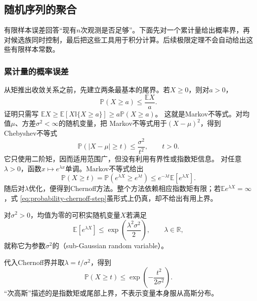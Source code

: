 \subsection{随机序列的聚合}
\label{sec:rv-aggregation}
有限样本误差回答“现有\(n\)次观测是否足够”。下面先对一个累计量给出概率界，再对候选族同时控制，最后把这些工具用于积分计算。后续极限定理不会自动给出这些有限样本常数。

\subsubsection{累计量的概率误差}
\label{sec:probability-basic-tail-bounds}
\label{sec:probability-concentration-inequalities}

从矩推出收敛关系之前，先建立两条最基本的尾界。若\(X\geq0\)，则对\(a>0\)，
\begin{equation}
  \mathbb{P}(X\geq a)
  \leq
  \frac{\mathbb{E}X}{a}.
  \label{eq:probability-markov-inequality}
\end{equation}
证明只需写
\(\mathbb{E}X\geq
\mathbb{E}[X\mathbb{I}\{X\geq a\}]
\geq a\mathbb{P}(X\geq a)\)。
这就是Markov不等式。对均值\(\mu\)、方差\(\sigma^2<\infty\)的随机变量，把
Markov不等式用于\((X-\mu)^2\)，得到Chebyshev不等式
\begin{equation}
  \mathbb{P}(|X-\mu|\geq t)
  \leq\frac{\sigma^2}{t^2},
  \qquad t>0.
  \label{eq:probability-chebyshev-inequality}
\end{equation}
它只使用二阶矩，因而适用范围广，但没有利用有界性或指数矩信息。
对任意\(\lambda>0\)，函数\(x\mapsto e^{\lambda x}\)单调。Markov不等式给出
\begin{equation}
  \mathbb{P}(X\geq t)
  =
  \mathbb{P}(e^{\lambda X}\geq e^{\lambda t})
  \leq
  e^{-\lambda t}\mathbb{E}[e^{\lambda X}].
  \label{eq:probability-chernoff-step}
\end{equation}
随后对\(\lambda\)优化，便得到Chernoff方法。整个方法依赖相应指数矩有限；若\(\mathbb{E}e^{\lambda X}=\infty\)，式
\eqref{eq:probability-chernoff-step}虽形式上仍真，却不给出有用上界。

\begin{definition}[次高斯变量]
  \label{def:probability-subgaussian}
对\(\sigma^2>0\)，均值为零的可积实随机变量\(X\)若满足
\[ \mathbb{E}[e^{\lambda X}]
  \leq\exp\left(\frac{\lambda^2\sigma^2}{2}\right),\qquad \lambda\in\mathbb{R}, \]
就称它为参数\(\sigma^2\)的（sub-Gaussian random variable）。
\end{definition}
代入Chernoff界并取\(\lambda=t/\sigma^2\)，得到
\[ \mathbb{P}(X\geq t)
  \leq\exp\left(-\frac{t^2}{2\sigma^2}\right). \]
“次高斯”描述的是指数矩或尾部上界，不表示变量本身服从高斯分布。

